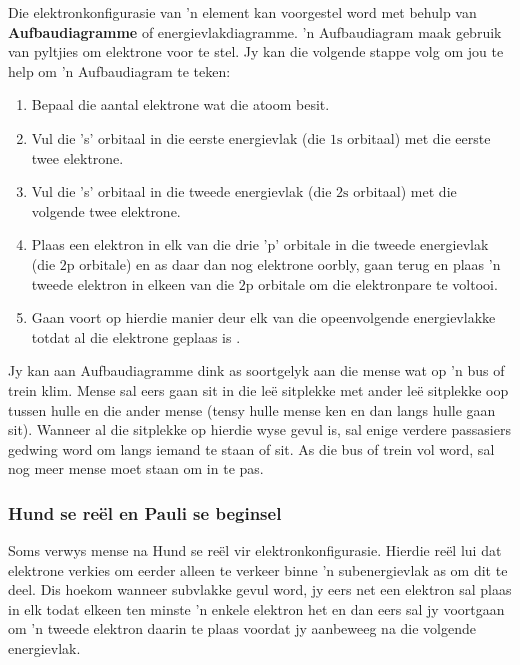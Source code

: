 Die elektronkonfigurasie van 'n element kan voorgestel word met behulp van \textbf{Aufbaudiagramme} of energievlakdiagramme. 'n Aufbaudiagram maak gebruik van pyltjies om elektrone voor te stel. Jy kan die volgende stappe volg om jou te help om 'n Aufbaudiagram te teken:\par 
\begin{enumerate}[noitemsep, label=\textbf{\arabic*}. ] 
\item Bepaal die aantal elektrone wat die atoom besit.
\item Vul die 's' orbitaal in die eerste energievlak (die $1\text{s}$ orbitaal) met die eerste twee elektrone.
\item Vul die 's' orbitaal in die tweede energievlak (die $2\text{s}$ orbitaal) met die volgende twee elektrone.
\item Plaas een elektron in elk van die drie 'p' orbitale in die tweede energievlak (die $2\text{p}$ orbitale) en as daar dan nog elektrone oorbly, gaan terug en plaas 'n tweede elektron in elkeen van die $2\text{p}$ orbitale om die elektronpare te voltooi.
\item Gaan voort op hierdie manier deur elk van die opeenvolgende energievlakke totdat al die elektrone geplaas is .
\end{enumerate}

        

Jy kan aan Aufbaudiagramme dink as soortgelyk aan die mense wat op 'n bus of trein klim. Mense sal eers gaan sit in die leë sitplekke met ander leë sitplekke oop tussen hulle en die ander mense (tensy hulle mense ken en dan langs hulle gaan sit). Wanneer al die sitplekke op hierdie wyse gevul is, sal enige verdere passasiers gedwing word om langs iemand te staan ​of sit. As die bus of trein vol word, sal nog meer mense moet staan ​om in te pas.\par

 
\subsubsection*{Hund se re\"el en Pauli se beginsel}
\nopagebreak
\label{m38741*eip-188}
Soms verwys mense na Hund se reël vir elektronkonfigurasie. Hierdie reël lui dat elektrone verkies om eerder alleen te verkeer binne ’n subenergievlak as om dit te deel. Dis hoekom wanneer subvlakke gevul word, jy eers net een elektron sal plaas in elk todat elkeen ten minste  'n enkele elektron het en dan eers sal jy voortgaan om  'n tweede elektron daarin te plaas voordat jy aanbeweeg na die volgende energievlak.
\par 

